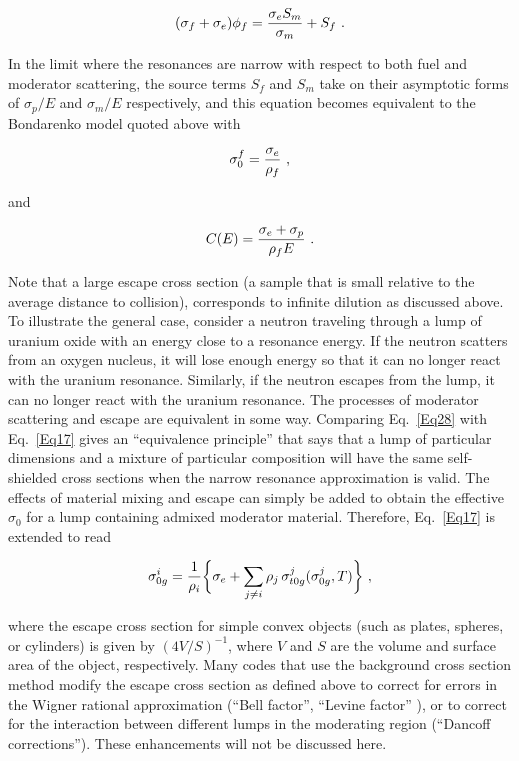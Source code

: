   \begin{equation}
    (\sigma_f+\sigma_e)\phi_f={{\sigma_e S_m}\over \sigma_m} +S_f \,\,.
  \label{Eq27}
  \end{equation}

\noindent
In the limit where the resonances are narrow with respect to both fuel
and moderator scattering, the source terms $S_f$ and $S_m$ take on their
asymptotic forms of $\sigma_p/E$ and $\sigma_m/E$ respectively, and this
equation becomes equivalent to the Bondarenko model quoted above with

  \begin{equation}
    \sigma_0^f={\sigma_e \over \rho_f}\,\,,
  \label{Eq28}
  \end{equation}

\noindent
and

  \begin{equation}
    C(E)={{\sigma_e+\sigma_p}\over{\rho_f E}}\,\,.
  \end{equation}

\noindent
Note that a large escape cross section (a sample that is small relative
to the average distance to collision), corresponds to infinite dilution
as discussed above.  To illustrate the general case, consider a neutron
traveling through a lump of uranium oxide with an energy close to a
resonance energy.  If the neutron scatters from an oxygen nucleus, it
will lose enough energy so that it can no longer react with the uranium
resonance.  Similarly, if the neutron escapes from the lump, it can no
longer react with the uranium resonance.  The processes of moderator
scattering and escape are equivalent in some way.  Comparing
Eq.~\ref{Eq28} with Eq.~\ref{Eq17} gives an
 ``equivalence principle''
that says that a lump of particular dimensions and a mixture of
particular composition will have the same self-shielded cross sections
when the narrow resonance approximation is valid.  The effects of
material mixing and escape can simply be added to obtain the effective
$\sigma_0$ for a lump containing admixed moderator material.  Therefore,
Eq.~\ref{Eq17} is extended to read

  \begin{equation}
    \sigma_{0g}^i ={{1} \over {\rho_i}}
    \biggl\lbrace \sigma_e +
    \sum_{j\ne i} \rho_j \,\sigma_{t0g}^j
    (\sigma_{0g}^j ,T) \biggr\rbrace \,\,,
  \end{equation}

\noindent
where the escape cross section for simple convex objects (such as plates,
spheres, or cylinders) is given by $(4V{/}S)^{-1}$, where $V$ and $S$
are the volume and surface area of the object, respectively.  Many codes
that use the background cross section method modify the escape cross section
as defined above to correct for errors in the Wigner rational
approximation (``Bell factor'',
``Levine factor'' ), or to correct for
the interaction between different lumps in the moderating region
(``Dancoff corrections'').  These
enhancements will not be discussed here.

